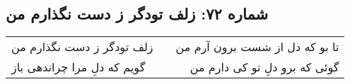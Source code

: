 \begin{center}
\section*{شماره ۷۲: زلف تودگر ز دست نگذارم من}
\label{sec:072}
\begin{longtable}{l p{0.5cm} r}
زلف تودگر ز دست نگذارم من
&&
تا بو که دل از شست برون آرم من
\\
گویم که دلِ مرا چراندهی باز
&&
گوئی که برو دلِ تو کی دارم من
\\
\end{longtable}
\end{center}
